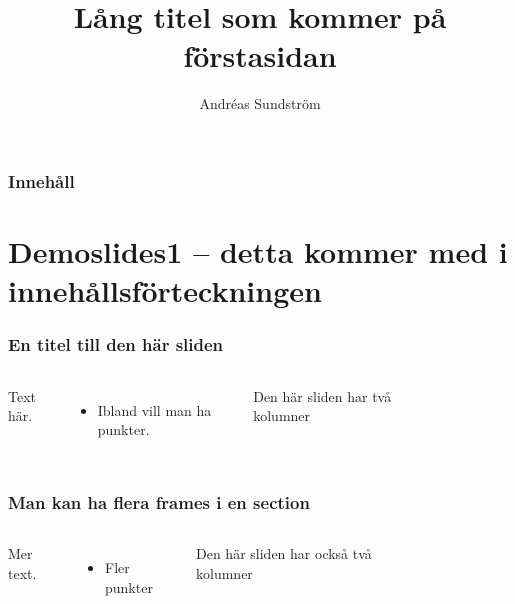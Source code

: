 \documentclass{beamer}
\title[Kort titel]{Lång titel som kommer på förstasidan} %
\subtitle{} %
\author{Andréas Sundström } %
\institute[Chalmers]{Chalmers tekniska högskla}
\date{\vspace{-0.25cm}}
\begin{document}
\begin{frame}[plain]

\linethickness{0.075mm}

  \titlepage
\end{frame}









\begin{frame}
\frametitle{Innehåll}

\tableofcontents

\end{frame}




\section{Demoslides1 -- detta kommer med i innehållsförteckningen }
\begin{frame}
\frametitle{En titel till den här sliden}
 \begin{columns}[c]
Text här.
\begin{itemize}
    \item Ibland vill man ha punkter.
\end{itemize}
Den här sliden har två kolumner
\begin{figure}
\end{figure}
\end{columns}
\end{frame}

\begin{frame}
\frametitle{Man kan ha flera frames i en section}
 \begin{columns}[c]
Mer text.
\begin{itemize}
    \item Fler punkter
\end{itemize}
Den här sliden har också två kolumner
\begin{figure}
\end{figure}
\end{columns}
\end{frame}
\end{document}
